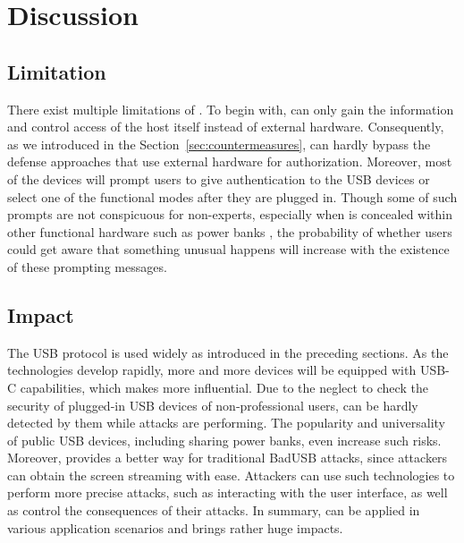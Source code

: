 \section{Discussion}
\label{sec:discussion}

\subsection{Limitation}

There exist multiple limitations of \tool.  To begin with, \tool can only gain
the information and control access of the host itself instead of external
hardware.  Consequently, as we introduced in the
Section~\ref{sec:countermeasures}, \tool can hardly bypass the defense
approaches that use external hardware for authorization.  Moreover, most of
the devices will prompt users to give authentication to the USB devices or
select one of the functional modes after they are plugged in.  Though some of
such prompts are not conspicuous for non-experts, especially when \tool is
concealed within other functional hardware such as power banks , the probability of whether users could get
aware that something unusual happens will increase with the existence of these
prompting messages.

\subsection{Impact}

The USB protocol is used widely as introduced in the preceding sections.  As the
technologies develop rapidly, more and more devices will be equipped with USB-C
capabilities, which makes \tool more influential.  Due to the neglect to
check the security of plugged-in USB devices of non-professional users, \tool
can be hardly detected by them while attacks are performing.  The popularity
and universality of public USB devices, including sharing power banks, even
increase such risks.  Moreover, \tool provides a better way for traditional
BadUSB attacks, since attackers can obtain the screen streaming with ease.
Attackers can use such technologies to perform more precise attacks, such as
interacting with the user interface, as well as control the consequences of their
attacks.  In summary, \tool can be applied in various application scenarios and
brings rather huge impacts.

